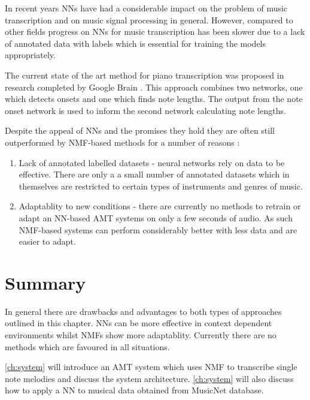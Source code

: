 In recent years NNs have had a considerable impact on the problem of music
transcription and on music signal processing in general. However, compared to
other fields progress on NNs for music transcription has been slower due to a
lack of annotated data with labels which is essential for training the models
appropriately. \cite{end-to-end-transcription2017:Carvalho}

The current state of the art method for piano transcription was proposed in
research completed by Google Brain \cite{google2018:Elsen}. This approach
combines two networks, one which detects onsets and one which finds note
lengths. The output from the note onset network is used to inform the second
network calculating note lengths.

Despite the appeal of NNs and the promises they hold they are often still
outperformed by NMF-based methods for a number of reasons :
\begin{enumerate}
  \item Lack of annotated labelled datasets - neural networks rely on data to be
        effective. There are only a a small number of annotated datasets which
        in themselves are restricted to certain types of instruments and genres
        of music. \cite{ground-truths:Su}
  \item Adaptablity to new conditions - there are currently no methods to
        retrain or adapt an NN-based AMT systems on only a few seconds of audio.
        As such NMF-based systems can perform considerably better with less data
        and are easier to adapt.
\end{enumerate}

\section{Summary}

In general there are drawbacks and advantages to both types of approaches
outlined in this chapter. NNs can be more effective in context dependent
environments whilst NMFs show more adaptablity. Currently there are no methods
which are favoured in all situations.

\autoref{ch:system} will introduce an AMT system which uses NMF to transcribe
single note melodies and discuss the system architecture. \autoref{ch:system}
will also discuss how to apply a NN to musical data obtained from
\citeyear{thickstun2018invariances} MusicNet database.